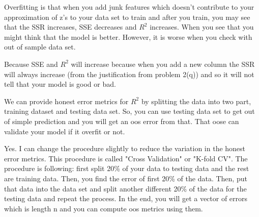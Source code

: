 \documentclass[12pt]{article}
\begin{document}
\begin{enumerate}
Overfitting is that when you add junk features which doesn't contribute to your approximation of z's to your data set to train and after you train, you may see that the SSR increases, SSE decreases and $R^2$ increases. When you see that you might think that the model is better. However, it is worse when you check with out of sample data set.




Because SSE and $R^2$ will increase because when you add a new column the SSR will always increase (from the justification from problem 2(q)) and so it will not tell that your model is good or bad.


We can provide honest error metrics for $R^2$ by splitting the data into two part, training dataset and testing data set. So, you can use testing data set to get out of simple prediction and you will get an oos error from that. That oose can validate your model if it overfit or not.



Yes. I can change the procedure slightly to reduce the variation in the honest error metrics. This procedure is called "Cross Validation" or "K-fold CV". The procedure is following: first split 20\% of your data to testing data and the rest are training data. Then, you find the error of first 20\% of the data. Then, put that data into the data set and split another different 20\% of the data for the testing data and repeat the process. In the end, you will get a vector of errors which is length n and you can compute oos metrics using them.



\end{enumerate}


\end{document}
